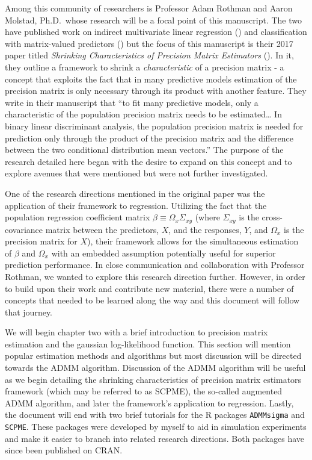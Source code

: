 \documentclass[11pt,]{report}
\theoremstyle{definition}
\theoremstyle{definition}
\theoremstyle{definition}
\theoremstyle{remark}
\begin{document}
Among this community of researchers is Professor Adam Rothman and Aaron Molstad, Ph.D.~whose research will be a focal point of this manuscript. The two have published work on indirect multivariate linear regression (\citet{molstad2016indirect}) and classification with matrix-valued predictors (\citet{molstad2018penalized}) but the focus of this manuscript is their 2017 paper titled \emph{Shrinking Characteristics of Precision Matrix Estimators} (\citet{molstad2017shrinking}). In it, they outline a framework to shrink a \emph{characteristic} of a precision matrix - a concept that exploits the fact that in many predictive models estimation of the precision matrix is only necessary through its product with another feature. They write in their manuscript that ``to fit many predictive models, only a characteristic of the population precision matrix needs to be estimated\ldots{} In binary linear discriminant analysis, the population precision matrix is needed for prediction only through the product of the precision matrix and the difference between the two conditional distribution mean vectors.'' The purpose of the research detailed here began with the desire to expand on this concept and to explore avenues that were mentioned but were not further investigated.

One of the research directions mentioned in the original paper was the application of their framework to regression. Utilizing the fact that the population regression coefficient matrix \(\beta \equiv \Omega_{x}\Sigma_{xy}\) (where \(\Sigma_{xy}\) is the cross-covariance matrix between the predictors, \(X\), and the responses, \(Y\), and \(\Omega_{x}\) is the precision matrix for \(X\)), their framework allows for the simultaneous estimation of \(\beta\) and \(\Omega_{x}\) with an embedded assumption potentially useful for superior prediction performance. In close communication and collaboration with Professor Rothman, we wanted to explore this research direction further. However, in order to build upon their work and contribute new material, there were a number of concepts that needed to be learned along the way and this document will follow that journey.

We will begin chapter two with a brief introduction to precision matrix estimation and the gaussian log-likelihood function. This section will mention popular estimation methods and algorithms but most discussion will be directed towards the ADMM algorithm. Discussion of the ADMM algorithm will be useful as we begin detailing the shrinking characteristics of precision matrix estimators framework (which may be referred to as SCPME), the so-called augmented ADMM algorithm, and later the framework's application to regression. Lastly, the document will end with two brief tutorials for the R packages \texttt{ADMMsigma} and \texttt{SCPME}. These packages were developed by myself to aid in simulation experiments and make it easier to branch into related research directions. Both packages have since been published on CRAN.
\end{document}
